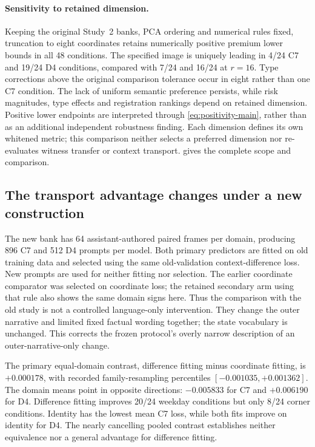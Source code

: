 \paragraph{Sensitivity to retained dimension.}
Keeping the original Study~2 banks, PCA ordering and numerical rules fixed, truncation to eight coordinates retains numerically positive premium lower bounds in all 48 conditions. The specified image is uniquely leading in 4/24 C7 and 19/24 D4 conditions, compared with 7/24 and 16/24 at $r=16$. Type corrections above the original comparison tolerance occur in eight rather than one C7 condition. The lack of uniform semantic preference persists, while risk magnitudes, type effects and registration rankings depend on retained dimension. Positive lower endpoints are interpreted through \cref{eq:positivity-main}, rather than as an additional independent robustness finding. Each dimension defines its own whitened metric; this comparison neither selects a preferred dimension nor re-evaluates witness transfer or context transport.  gives the complete scope and comparison.

\subsection{The transport advantage changes under a new construction}

The new bank has 64 assistant-authored paired frames per domain, producing 896 C7 and 512 D4 prompts per model. Both primary predictors are fitted on old training data and selected using the same old-validation context-difference loss. New prompts are used for neither fitting nor selection. The earlier coordinate comparator was selected on coordinate loss; the retained secondary arm using that rule also shows the same domain signs here. Thus the comparison with the old study is not a controlled language-only intervention. They change the outer narrative and limited fixed factual wording together; the state vocabulary is unchanged. This corrects the frozen protocol's overly narrow description of an outer-narrative-only change.

The primary equal-domain contrast, difference fitting minus coordinate fitting, is $+0.000178$, with recorded family-resampling percentiles $[-0.001035,+0.001362]$. The domain means point in opposite directions: $-0.005833$ for C7 and $+0.006190$ for D4. Difference fitting improves 20/24 weekday conditions but only 8/24 corner conditions. Identity has the lowest mean C7 loss, while both fits improve on identity for D4. The nearly cancelling pooled contrast establishes neither equivalence nor a general advantage for difference fitting.


